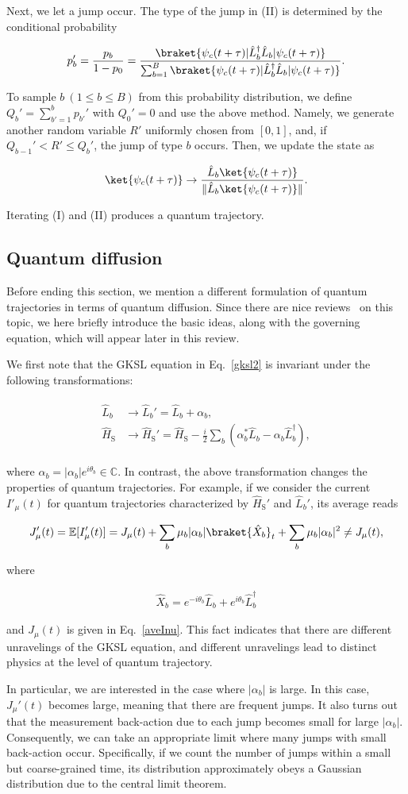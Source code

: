 \documentclass[preprint,pteplogo]{ptephy_v2}%
\numberwithin{equation}{section}
\theoremstyle{definition}
\newcommand{\mr}[1]{\mathrm{#1}}
\newcommand{\mbb}[1]{\mathbb{#1}}
\newcommand{\aln}[1]{
\begin{align}
#1
\end{align}
}
\newcommand{\ra}{\rightarrow}
\begin{document}
Next, we let a jump occur. 
The type of the jump in (II) is determined by the conditional probability
\aln{
p_b'=\frac{p_b}{1-p_0}=\frac{\braket{\psi_c(t+\tau)|\hat{L}_b^\dag\hat{L}_b|\psi_c(t+\tau)}}{\sum_{b=1}^B\braket{\psi_c(t+\tau)|\hat{L}_b^\dag\hat{L}_b|\psi_c(t+\tau)}}.
}
To sample $b\:(1\leq b\leq B)$ from this probability distribution, we define $Q_b'=\sum_{b'=1}^bp_{b'}'$ with $Q_0'=0$ and use the above method.
Namely, we generate another random variable $R'$ uniformly chosen from $[0,1]$, and, if $Q_{b-1}'<R'\leq Q_b'$, the jump of type $b$ occurs.
Then, we update the state as
\aln{
\ket{\psi_c(t+\tau)}\ra \frac{\hat{L}_b\ket{\psi_c(t+\tau)}}{\|\hat{L}_b\ket{\psi_c(t+\tau)}\|}.
}
Iterating (I) and (II) produces a quantum trajectory.


\subsection{Quantum diffusion}
\label{sec:Quantum diffusion}
Before ending this section, we mention a different formulation of quantum trajectories in terms of quantum diffusion.
Since there are nice reviews~\cite{wiseman2009quantum, landi2024current} on this topic, we here briefly introduce the basic ideas, along with the governing equation, which will appear later in this review.

We first note that the GKSL equation in Eq.~\eqref{gksl2} is invariant under the following transformations:
\aln{
\begin{split}
\hat{L}_b &\longrightarrow \hat{L}_b'=\hat{L}_b+\alpha_b, \\
\hat{H}_\mr{S} &\longrightarrow \hat{H}_\mr{S}'=\hat{H}_\mr{S}-\frac{i}{2}{\sum_b}(\alpha_b^*\hat{L}_b-\alpha_b\hat{L}_b^\dag),
\end{split}
}
where $\alpha_b=|\alpha_b|e^{i\theta_b}\in\mbb{C}$.
In contrast, the above transformation changes the properties of quantum trajectories.
For example, if we consider the current $I'_\mu(t)$ for quantum trajectories characterized by $\hat{H}_\mr{S}'$ and $\hat{L}_b'$, its average reads
\aln{
J_\mu'(t)=\mathbb{E}[I'_\mu(t)]=J_\mu(t)+\sum_b\mu_b|\alpha_b|\braket{\hat{X}_b}_t+\sum_b\mu_b|\alpha_b|^2\neq J_\mu(t),
}
where
\aln{
\hat{X}_b=e^{-i\theta_b}\hat{L}_b+e^{i\theta_b}\hat{L}_b^\dag
}
and $J_\mu(t)$ is given in Eq.~\eqref{aveInu}.
This fact indicates that there are different unravelings of the GKSL equation, and different unravelings lead to distinct physics at the level of quantum trajectory.

In particular, we are interested in the case where $|\alpha_b|$ is large.
In this case, $J_\mu'(t)$ becomes large, meaning that there are frequent jumps.
It also turns out that the measurement back-action due to each jump becomes small for large $|\alpha_b|$.
Consequently, we can take an appropriate limit where many jumps with small back-action occur.
Specifically, if we count the number of jumps within a small but coarse-grained time, its distribution approximately obeys a Gaussian distribution due to the central limit theorem.
\end{document}

